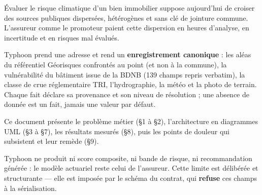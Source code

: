 \documentclass[11pt,a4paper,oneside]{report}
\begin{document}
Évaluer le risque climatique d'un bien immobilier suppose aujourd'hui de croiser
des sources publiques dispersées, hétérogènes et sans clé de jointure commune.
L'assureur comme le promoteur paient cette dispersion en heures d'analyse, en
incertitude et en risques mal évalués.

Typhoon prend une adresse et rend un \textbf{enregistrement canonique} : les
aléas du référentiel Géorisques confrontés au point (et non à la commune), la
vulnérabilité du bâtiment issue de la BDNB (139 champs repris verbatim), la
classe de crue réglementaire TRI, l'hydrographie, la météo et la photo de
terrain. Chaque fait déclare sa provenance et son niveau de résolution ; une
absence de donnée est un fait, jamais une valeur par défaut.

Ce document présente le problème métier (\S1 à \S2), l'architecture en
diagrammes UML (\S3 à \S7), les résultats mesurés (\S8), puis les points de
douleur qui subsistent et leur remède (\S9).

\begin{encadre}[title={Ce que le document ne prétend pas}]
Typhoon ne produit ni score composite, ni bande de risque, ni recommandation
générée : le modèle actuariel reste celui de l'assureur. Cette limite est
délibérée et structurante — elle est imposée par le schéma du contrat, qui
\textbf{refuse} ces champs à la sérialisation.
\end{encadre}

\clearpage

\renewcommand{\contentsname}{Sommaire}
\tableofcontents

\clearpage












\appendix


\end{document}
